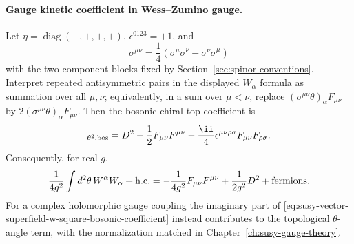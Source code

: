 \paragraph{Gauge kinetic coefficient in Wess--Zumino gauge.}
Let \(\eta=\operatorname{diag}(-,+,+,+)\),
\(\epsilon^{0123}=+1\), and
\[
  \sigma^{\mu\nu}
  =
  \frac14\left(\sigma^\mu\bar\sigma^\nu
  -\sigma^\nu\bar\sigma^\mu\right)
\]
with the two-component blocks fixed by
Section~\ref{sec:spinor-conventions}.  Interpret repeated antisymmetric
pairs in the displayed \(W_\alpha\) formula as summation over all
\(\mu,\nu\); equivalently, in a sum over \(\mu<\nu\), replace
\((\sigma^{\mu\nu}\theta)_\alpha F_{\mu\nu}\) by
\(2(\sigma^{\mu\nu}\theta)_\alpha F_{\mu\nu}\).  Then the bosonic chiral
top coefficient is
\begin{equation}
  [W^\alpha W_\alpha]_{\theta^2,{\rm bos}}
  =
  D^2
  -\frac12 F_{\mu\nu}F^{\mu\nu}
  -\frac{\ii}{4}
  \epsilon^{\mu\nu\rho\sigma}F_{\mu\nu}F_{\rho\sigma}.
  \label{eq:susy-vector-superfield-w-square-bosonic-coefficient}
\end{equation}
Consequently, for real \(g\),
\begin{equation}
  \frac{1}{4g^2}\int d^2\theta\,W^\alpha W_\alpha
  +{\rm h.c.}
  =
  -\frac{1}{4g^2}F_{\mu\nu}F^{\mu\nu}
  +\frac{1}{2g^2}D^2
  +\hbox{fermions}.
  \label{eq:susy-vector-superfield-gauge-kinetic-component}
\end{equation}
For a complex holomorphic gauge coupling the imaginary part of
\eqref{eq:susy-vector-superfield-w-square-bosonic-coefficient} instead
contributes to the topological \(\theta\)-angle term, with the normalization
matched in Chapter~\ref{ch:susy-gauge-theory}.

